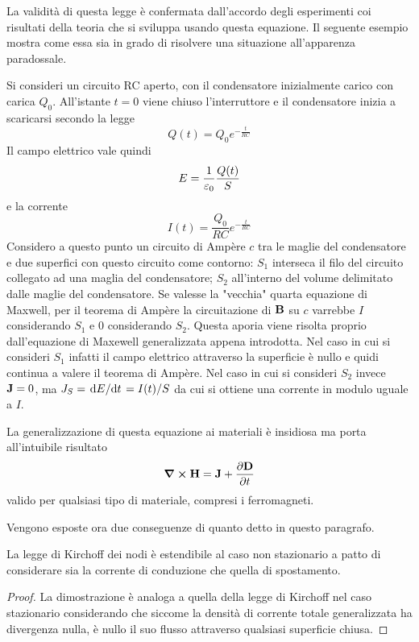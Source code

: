 La validità di questa legge è confermata dall'accordo degli esperimenti coi risultati della teoria che
si sviluppa usando questa equazione. Il seguente esempio mostra come essa sia in grado di risolvere una
situazione all'apparenza paradossale.
\begin{example}
    Si consideri un circuito RC aperto, con il condensatore inizialmente carico con carica $Q_0$.
    All'istante $t=0$ viene chiuso
    l'interruttore e il condensatore inizia a scaricarsi secondo la legge
    \[
        Q(t)=Q_0e^{-\frac{t}{RC}}
    \]
    Il campo elettrico vale quindi
    \[
        E=\frac{1}{\varepsilon_0}\frac{Q(t)}{S}
    \]
    e la corrente
    \[
        I(t)=\frac{Q_0}{RC}e^{-\frac{t}{RC}}
    \]
    Considero a questo punto un circuito di Ampère $c$ tra le maglie del condensatore e due superfici con questo circuito
    come contorno: $S_1$ interseca il filo del circuito collegato ad una maglia del condensatore; $S_2$ all'interno
    del volume delimitato dalle maglie del condensatore. Se valesse la "vecchia" quarta equazione di Maxwell, per il
    teorema di Ampère la circuitazione di $\vb{B}$ su $c$ varrebbe $I$ considerando $S_1$ e $0$ considerando $S_2$. Questa aporia viene
    risolta proprio dall'equazione di Maxewell generalizzata appena introdotta. Nel caso in cui si consideri $S_1$ infatti
    il campo elettrico attraverso la superficie è nullo e quidi continua a valere il teorema di Ampère. Nel caso in cui
    si consideri $S_2$ invece $\vb{J}=0$, ma $J_S=\dv*{E}{t}=I(t)/S$ da cui si ottiene una corrente in modulo uguale a $I$.
\end{example}

La generalizzazione di questa equazione ai materiali è insidiosa
ma porta all'intuibile risultato
\begin{equation}
    \curl{\vb{H}}=\vb{J}+\pdv{\vb{D}}{t}
\end{equation}
valido per qualsiasi tipo di materiale, compresi i ferromagneti.

Vengono esposte ora due conseguenze di quanto detto in questo paragrafo.

\begin{obs}
    La legge di Kirchoff dei nodi è estendibile al caso non stazionario a patto di considerare sia la corrente di
    conduzione che quella di spostamento.
\end{obs}
\begin{proof}
    La dimostrazione è analoga a quella della legge di Kirchoff nel caso stazionario considerando che
    siccome la densità di corrente totale generalizzata ha divergenza nulla, è nullo il suo flusso attraverso qualsiasi
    superficie chiusa.
\end{proof}

